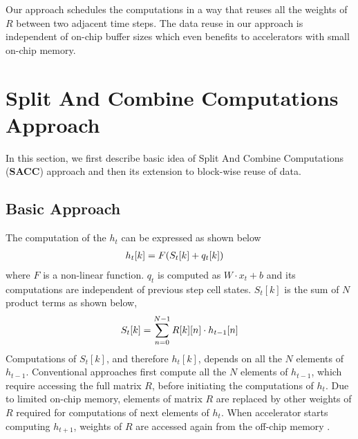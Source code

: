 Our approach schedules the computations in a way that reuses all the weights of $R$ between two adjacent time steps. The data reuse in our approach is independent of on-chip buffer sizes which even benefits to accelerators with small on-chip memory. 

\section{Split And Combine Computations Approach}
In this section, we first describe basic idea of Split And Combine Computations (\textbf{SACC}) approach and then its extension to block-wise reuse of data.
\subsection{Basic Approach}\label{sec:elementWiseApproach}
The computation of the $h_t$ can be expressed as shown below
\begin{align}\label{eq:h_{t}}
	h_{t}[k] &= F( S_{t}[k]+q_{t}[k])
\end{align}
where $F$ is a non-linear function. $q_{t}$ is computed as $W{\cdot}x_t{+}b$ and its computations are independent of previous step cell states. $S_{t}[k]$ is the sum of $N$ product terms as shown below,
\begin{align}\label{eq:S_{t}}
	S_{t}[k] = \sum_{n=0}^{N-1}R[k][n]\cdot h_{t-1}[n]
\end{align}
Computations of $S_{t}[k]$, and therefore $h_{t}[k]$, depends on all the $N$ elements of $h_{t-1}$. Conventional approaches first compute all the $N$ elements of $h_{t-1}$, which require accessing the full matrix $R$, before initiating the computations of $h_{t}$. Due to limited on-chip memory, elements of matrix $R$ are replaced by other weights of $R$ required for computations of next elements of $h_{t}$. When accelerator starts computing $h_{t+1}$, weights of $R$ are accessed again from the off-chip memory .


